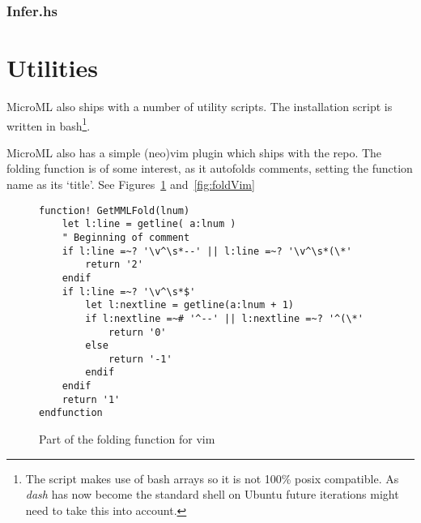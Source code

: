 \subsubsection{Infer.hs}



\section{Utilities}
MicroML also ships with a number of utility scripts.
The installation script is written in bash\footnote{The script makes use of bash arrays so it is not
100\% posix compatible. As \textit{dash} has now become the standard shell on Ubuntu future
iterations might need to take this into account.}.


MicroML also has a simple (neo)vim plugin which ships with the repo. The folding function is of some
interest, as it autofolds comments, setting the function name as its `title'. See
Figures~\ref{fig:fold} and~\ref{fig:foldVim}

\begin{figure}
    \begin{verbatim}
function! GetMMLFold(lnum) 
    let l:line = getline( a:lnum )
    " Beginning of comment
    if l:line =~? '\v^\s*--' || l:line =~? '\v^\s*(\*'
        return '2'
    endif
    if l:line =~? '\v^\s*$'
        let l:nextline = getline(a:lnum + 1)
        if l:nextline =~# '^--' || l:nextline =~? '^(\*'
            return '0'
        else
            return '-1'
        endif
    endif
    return '1'
endfunction 
    \end{verbatim}
    \caption{Part of the folding function for vim}
\label{fig:fold}
\end{figure}
